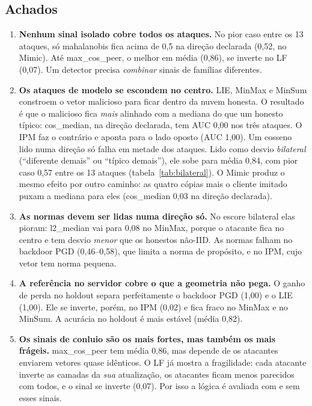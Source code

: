 \documentclass[11pt,a4paper]{article}
\begin{document}
\subsection{Achados}
\begin{enumerate}
  \item \textbf{Nenhum sinal isolado cobre todos os ataques.} No pior caso entre os 13 ataques, só
        mahalanobis fica acima de 0,5 na direção declarada (0,52, no Mimic). Até max\_cos\_peer, o melhor
        em média (0,86), se inverte no LF (0,07). Um detector precisa \emph{combinar} sinais de famílias
        diferentes.

  \item \textbf{Os ataques de modelo se escondem no centro.} LIE, MinMax e MinSum constroem o vetor
        malicioso para ficar dentro da nuvem honesta. O resultado é que o malicioso fica \emph{mais}
        alinhado com a mediana do que um honesto típico: cos\_median, na direção declarada, tem AUC 0,00
        nos três ataques. O IPM faz o contrário e aponta para o lado oposto (AUC 1,00). Um cosseno lido
        numa direção só falha em metade dos ataques. Lido como desvio \emph{bilateral} (``diferente
        demais'' ou ``típico demais''), ele sobe para média 0,84, com pior caso 0,57 entre os 13 ataques
        (tabela~\ref{tab:bilateral}). O Mimic produz o mesmo efeito por outro caminho: as quatro cópias
        mais o cliente imitado puxam a mediana para eles (cos\_median 0,03 na direção declarada).

  \item \textbf{As normas devem ser lidas numa direção só.} No escore bilateral elas pioram: l2\_median
        vai para 0,08 no MinMax, porque o atacante fica no centro e tem desvio \emph{menor} que os honestos
        não-IID. As normas falham no backdoor PGD (0,46--0,58), que limita a norma de propósito, e no IPM,
        cujo vetor tem norma pequena.

  \item \textbf{A referência no servidor cobre o que a geometria não pega.} O ganho de perda no holdout
        separa perfeitamente o backdoor PGD (1,00) e o LIE (1,00). Ele se inverte, porém, no IPM (0,02) e
        fica fraco no MinMax e no MinSum. A acurácia no holdout é mais estável (média 0,82).

  \item \textbf{Os sinais de conluio são os mais fortes, mas também os mais frágeis.} max\_cos\_peer tem
        média 0,86, mas depende de os atacantes enviarem vetores quase idênticos. O LF já mostra a
        fragilidade: cada atacante inverte as camadas da \emph{sua} atualização, os atacantes ficam menos
        parecidos com todos, e o sinal se inverte (0,07). Por isso a lógica é avaliada com e sem esses
        sinais.


\end{enumerate}
\end{document}
